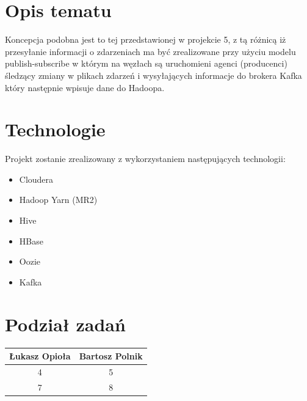 \documentclass[a4paper,11pt]{article}
\begin{document}
\section{Opis tematu}
    Koncepcja podobna jest to tej przedstawionej w projekcie 5, z tą różnicą iż przesyłanie informacji o zdarzeniach ma być zrealizowane przy użyciu modelu publish-subscribe w którym na węzłach są uruchomieni agenci (producenci) śledzący zmiany w plikach zdarzeń i wysyłających informacje do brokera Kafka który następnie wpisuje dane do Hadoopa.

\section{Technologie} 
    Projekt zostanie zrealizowany z wykorzystaniem następujących technologii:
    \begin{itemize}
        \item Cloudera
        \item Hadoop Yarn (MR2)
        \item Hive
        \item HBase
        \item Oozie
        \item Kafka
    \end{itemize}

\section{Podział zadań}

\begin{tabular}{ c | c }
  Łukasz Opioła & Bartosz Polnik \\ \hline
  4 & 5 \\
  7 & 8 \\
\end{tabular}
\end{document}
